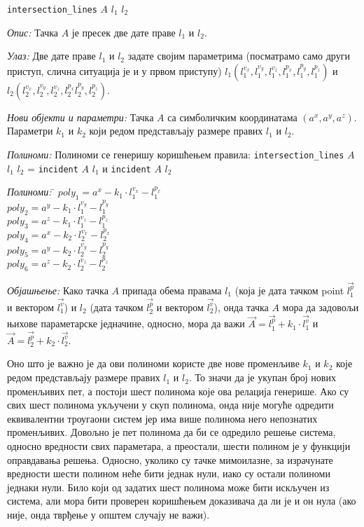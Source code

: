 {\tt intersection\_lines} $A$ $l_1$ $l_2$

{\em Опис:} Тачка $A$ је пресек две дате праве $l_1$ и $l_2$.

{\em Улаз:} Две дате праве $l_1$ и $l_2$ задате својим параметрима
(посматрамо само други приступ, слична ситуација је и у првом
приступу) $l_1(l_1^{v_x}, l_1^{v_y}, l_1^{v_z}, l_1^{p_x}, l_1^{p_y},
l_1^{p_z})$ и $l_2(l_2^{v_x}, l_2^{v_y}, l_2^{v_z}, l_2^{p_x}
l_2^{p_y}, l_2^{p_z})$. 

{\em Нови објекти и параметри:} Тачка $A$ са симболичким координатама
$(a^x, a^y, a^z)$. Параметри $k_1$ и $k_2$ који редом представљају
размере правих $l_1$ и $l_2$.

{\em Полиноми:} Полиноми се генеришу коришћењем правила:
{\tt intersection\_lines} $A$ $l_1$ $l_2$ = {\tt incident} $A$ $l_1$ и {\tt incident} $A$ $l_2$

\begin{tabbing}
{\em Полиноми:} \= $poly_1 = a^x - k_1\cdot l_1^{v_x} - l_1^{p_x}$ \\
                   \> $poly_2 = a^y - k_1\cdot l_1^{v_y} - l_1^{p_y}$ \\
                   \> $poly_3 = a^z - k_1\cdot l_1^{v_z} - l_1^{p_z}$ \\
                   \> $poly_4 = a^x - k_2\cdot l_2^{v_x} - l_2^{p_x}$ \\
                   \> $poly_5 = a^y - k_2\cdot l_2^{v_y} - l_2^{p_y}$ \\
                   \> $poly_6 = a^z - k_2\cdot l_2^{v_z} - l_2^{p_z}$
\end{tabbing}

{\em Објашњење:} Како тачка $A$ припада обема правама $l_1$ (која је
дата тачком point $\overrightarrow{l_1^p}$ и вектором
$\overrightarrow{l_1^v}$) и $l_2$ (дата тачком
$\overrightarrow{l_2^p}$ и вектором $\overrightarrow{l_2^v}$), онда
тачка $A$ мора да задовољи њихове параметарске једначине, односно,
мора да важи
$\overrightarrow{A} = \overrightarrow{l_1^p} + k_1 \cdot
\overrightarrow{l_1^v}$
и
$\overrightarrow{A} = \overrightarrow{l_2^p} + k_2 \cdot
\overrightarrow{l_2^v}$.

Оно што је важно је да ови полиноми користе две нове променљиве $k_1$
и $k_2$ које редом представљају размере правих $l_1$ и $l_2$. То значи
да је укупан број нових променљивих пет, а постоји шест полинома које
ова релација генерише. Ако су свих шест полинома укључени у скуп
полинома, онда није могуће одредити еквивалентни троугаони систем јер
има више полинома него непознатих променљивих. Довољно је пет полинома
да би се одредило решење система, односно вредности свих параметара, а
преостали, шести полином је у функцији оправдавања решења. Односно,
уколико су тачке мимоилазне, за израчунате вредности шести полином
неће бити једнак нули, иако су остали полиноми једнаки нули. Било који
од задатих шест полинома може бити искључен из система, али мора бити
проверен коришћењем доказивача да ли је и он нула (ако није, онда
тврђење у општем случају не важи).

